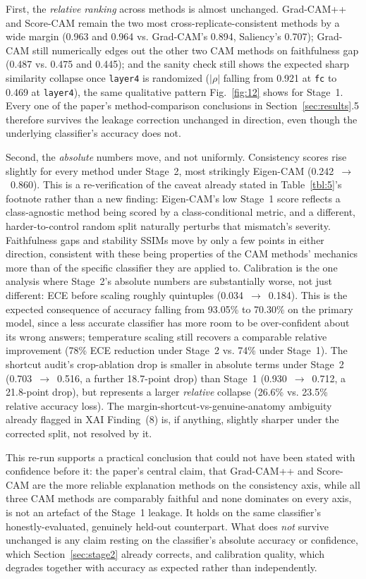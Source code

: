 First, the \textit{relative ranking} across methods is almost unchanged. Grad-CAM++ and Score-CAM remain the two most cross-replicate-consistent methods by a wide margin (0.963 and 0.964 vs. Grad-CAM's 0.894, Saliency's 0.707); Grad-CAM still numerically edges out the other two CAM methods on faithfulness gap (0.487 vs. 0.475 and 0.445); and the sanity check still shows the expected sharp similarity collapse once \texttt{layer4} is randomized ($|\rho|$ falling from 0.921 at \texttt{fc} to 0.469 at \texttt{layer4}), the same qualitative pattern Fig.~\ref{fig:12} shows for Stage~1. Every one of the paper's method-comparison conclusions in Section~\ref{sec:results}.5 therefore survives the leakage correction unchanged in direction, even though the underlying classifier's accuracy does not.

Second, the \textit{absolute} numbers move, and not uniformly. Consistency scores rise slightly for every method under Stage~2, most strikingly Eigen-CAM (0.242~$\rightarrow$~0.860). This is a re-verification of the caveat already stated in Table~\ref{tbl:5}'s footnote rather than a new finding: Eigen-CAM's low Stage~1 score reflects a class-agnostic method being scored by a class-conditional metric, and a different, harder-to-control random split naturally perturbs that mismatch's severity. Faithfulness gaps and stability SSIMs move by only a few points in either direction, consistent with these being properties of the CAM methods' mechanics more than of the specific classifier they are applied to. Calibration is the one analysis where Stage~2's absolute numbers are substantially worse, not just different: ECE before scaling roughly quintuples (0.034~$\rightarrow$~0.184). This is the expected consequence of accuracy falling from 93.05\% to 70.30\% on the primary model, since a less accurate classifier has more room to be over-confident about its wrong answers; temperature scaling still recovers a comparable relative improvement (78\% ECE reduction under Stage~2 vs. 74\% under Stage~1). The shortcut audit's crop-ablation drop is smaller in absolute terms under Stage~2 (0.703~$\rightarrow$~0.516, a further 18.7-point drop) than Stage~1 (0.930~$\rightarrow$~0.712, a 21.8-point drop), but represents a larger \textit{relative} collapse (26.6\% vs. 23.5\% relative accuracy loss). The margin-shortcut-vs-genuine-anatomy ambiguity already flagged in XAI Finding~(8) is, if anything, slightly sharper under the corrected split, not resolved by it.

This re-run supports a practical conclusion that could not have been stated with confidence before it: the paper's central claim, that Grad-CAM++ and Score-CAM are the more reliable explanation methods on the consistency axis, while all three CAM methods are comparably faithful and none dominates on every axis, is not an artefact of the Stage~1 leakage. It holds on the same classifier's honestly-evaluated, genuinely held-out counterpart. What does \textit{not} survive unchanged is any claim resting on the classifier's absolute accuracy or confidence, which Section~\ref{sec:stage2} already corrects, and calibration quality, which degrades together with accuracy as expected rather than independently.

